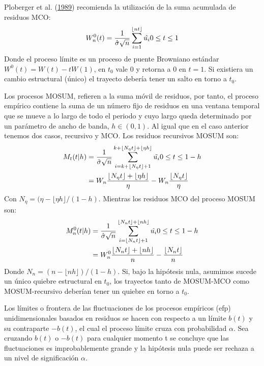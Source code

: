 \documentclass[12pt,oneside]{reedthesis}
\begin{document}
Ploberger et al. (\protect\hyperlink{ref-Ploberger1989}{1989}) recomienda la utilización de la suma acumulada de residuos MCO:
\begin{equation}
W_n^0(t) = \frac{1}{\hat{\sigma}\sqrt n}\sum_{i=1}^{\lfloor nt\rfloor}\hat{u_i}\space\space\space\space\space 0 \leq t \leq 1
\end{equation}
Donde el proceso límite es un proceso de puente Browniano estándar \(W^0(t) = W(t) - tW(1)\), en \(t_0\) vale 0 y retorna a 0 en \(t = 1\). Si existiera un cambio estructural (único) el trayecto debería tener un salto en torno a \(t_0\).

Los procesos MOSUM, refieren a la suma móvil de residuos, por tanto, el proceso empírico contiene la suma de un número fijo de residuos en una ventana temporal que se mueve a lo largo de todo el periodo y cuyo largo queda determinado por un parámetro de ancho de banda, \(h \in(0,1)\). Al igual que en el caso anterior tenemos dos casos, recursivo y MCO. Los residuos recursivos MOSUM son:
\begin{align}
M_t(t|h) &= \frac{1}{\tilde\sigma\sqrt n}\sum_{i=k+\lfloor N_{\eta}t\rfloor + 1}^{k + \lfloor N_{\eta}t\rfloor + \lfloor \eta h\rfloor}\tilde{u_i} \space\space\space\space\space 0\leq t\leq1-h \\
&= W_n\frac{\lfloor N_{\eta}t\rfloor+\lfloor\eta h\rfloor}{\eta}-W_n\frac{\lfloor N_{\eta}t\rfloor}{\eta}
\end{align}
Con \(N_{\eta} = (\eta - \lfloor\eta h\rfloor/(1-h)\). Mientras los residuos MCO del proceso MOSUM son:
\begin{align}
M_n^0(t|h) &= \frac{1}{\hat{\sigma}\sqrt n}\sum_{i=\lfloor N_{n}t\rfloor + 1}^{\lfloor N_{n}t \rfloor + \lfloor nh\rfloor}\hat{u_i} \space\space\space\space\space\space 0 \leq t \leq 1-h \\
&= W_n^0\frac{\lfloor N_nt\rfloor + \lfloor nh \rfloor}{n} - \frac{\lfloor N_nt\rfloor}{n}
\end{align}
Donde \(N_n = (n - \lfloor nh\rfloor)/(1-h)\). Si, bajo la hipótesis nula, asumimos sucede un único quiebre estructural en \(t_0\), los trayectos tanto de MOSUM-MCO como MOSUM-recursivo deberían tener un quiebre en torno a \(t_0\).

Los límites o frontera de las fluctuaciones de los procesos empíricos (efp) unidimensionales basados en residuos se hacen con respecto a un límite \(b(t)\) y su contraparte \(-b(t)\), el cual el proceso límite cruza con probabilidad \(\alpha\). Sea cruzando \(b(t)\) o \(-b(t)\) para cualquier momento t se concluye que las fluctuaciones es improbablemente grande y la hipótesis nula puede ser rechaza a un nivel de significación \(\alpha\).
\end{document}
